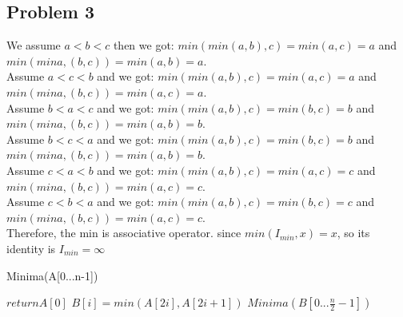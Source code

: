\documentclass[11pt]{article}
\begin{document}
\subsection{Problem 3}
We assume $a<b<c$ then we got:
$min (min (a,b),c) = min(a,c) = a$ and
$min (min a,(b,c)) = min(a,b) = a$.\\
Assume $a<c<b$ and we got:
$min (min (a,b),c) = min(a,c) = a$ and
$min (min a,(b,c)) = min(a,c) = a$.\\
Assume $b<a<c$ and we got:
$min (min (a,b),c) = min(b,c) = b$ and
$min (min a,(b,c)) = min(a,b) = b$.\\
Assume $b<c<a$ and we got:
$min (min (a,b),c) = min(b,c) = b$ and
$min (min a,(b,c)) = min(a,b) = b$.\\
Assume $c<a<b$ and we got:
$min (min (a,b),c) = min(a,c) = c$ and
$min (min a,(b,c)) = min(a,c) = c$.\\
Assume $c<b<a$ and we got:
$min (min (a,b),c) = min(b,c) = c$ and
$min (min a,(b,c)) = min(a,c) = c$.\\
Therefore, the min is associative operator.
since $min(I_{min},x) = x$, so its identity is $I_{min} = \infty$

\begin{algorithm}
\caption{Minima(A[0...n-1])}
\begin{algorithmic}
    \STATE $return A[0]$
\ELSE
        \STATE $B[i] = min(A[2i], A[2i+1])$
    \ENDFOR
    \STATE $Minima(B[0...\frac{n}{2}-1])$
\ENDIF

\end{algorithmic}
\end{algorithm}

%

\end{document}
